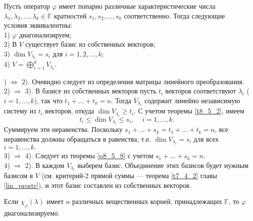 \begin{theor}\label{t8_5_3}
Пусть оператор $\varphi$
имеет попарно различные характеристические числа
$\lambda_1, \lambda_2, \ldots , \lambda_k\in \mathbb{F}$  кратностей
$s_1, s_2, \ldots , s_k$ соответственно. Тогда следующие условия эквивалентны:\\
1) $\varphi$ диагонализируем;\\
2) В $V$ существует базис из собственных векторов; \\ %
3) $\dim V_{\lambda _i} = s_i$ для $i=1, 2, \ldots, k$;\\
4) $V = \bigoplus \limits_{i=1}^k V_{\lambda _i}$. %
\end{theor}
) $\Leftrightarrow$ 2). Очевидно следует из определения матрицы линейного преобразования.\\
2) $\Rightarrow$ 3). %
В базисе из собственных векторов пусть $t_i$ векторов соответствуют $\lambda _i$ ($i=1, \ldots, k$),
так что $t_1+\ldots +t_k = n$.
Тогда $V_{\lambda _i}$ содержит линейно независимую систему из $t_i$ векторов,
откуда $\dim V_{\lambda _i} \geq  t_i$. 
С учетом теоремы \ref{t8_5_2}, имеем
$$t_i\leq \dim V_{\lambda _i} \leq  s_i, \,\,\,\,\,\,\,i=1, \ldots, k.$$
Суммируем эти неравенства. Поскольку $s_1+\ldots +s_k =  t_1+\ldots +t_k = n$, 
все неравенства должны обращаться в равенства, т.е. $\dim V_{\lambda _i} =  s_i$ для всех $i=1, \ldots, k.$\\
3) $\Rightarrow$ 4). Следует из теоремы  \ref{p8_5_8} с учетом $s_1+\ldots +s_k =  n$.\\
4) $\Rightarrow$ 2). В каждом $V_{\lambda_i}$ выберем базис. Объединение 
этих базисов будет нужным базисом в $V$ (см. критерий-2 прямой суммы --- теорема \ref{t7_4_2}
главы \ref{lin_prostr}), и этот базис составлен из собственных векторов. 
\edok

\otstup



\begin{sled}
Если $\chi_{\varphi} (\lambda )$ имеет $n$ различных вещественных корней, принадлежащих 
$\mathbb{F}$, то $\varphi$ диагонализируемо.
\end{sled}

